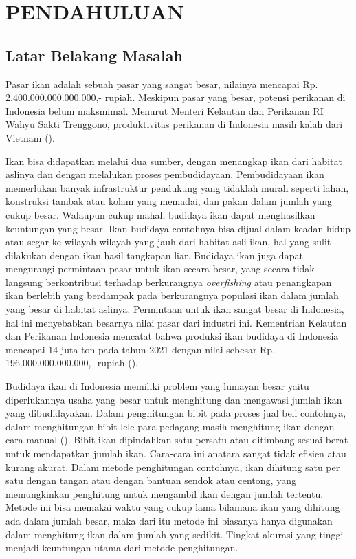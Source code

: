 
\chapter{PENDAHULUAN}

\section{Latar Belakang Masalah}

Pasar ikan adalah sebuah pasar yang sangat besar, nilainya mencapai 
Rp. 2.400.000.000.000.000,- rupiah. Meskipun pasar yang besar, potensi 
perikanan di Indonesia belum maksmimal. 
Menurut Menteri Kelautan dan Perikanan RI Wahyu Sakti Trenggono, produktivitas 
perikanan di Indonesia masih kalah dari Vietnam (\cite{harianjogja}). 

Ikan bisa didapatkan melalui dua sumber, dengan menangkap ikan dari habitat 
aslinya dan dengan melalukan proses pembudidayaan. Pembudidayaan ikan 
memerlukan banyak infrastruktur pendukung yang tidaklah murah seperti 
lahan, konstruksi tambak atau kolam yang memadai, dan pakan dalam jumlah 
yang cukup besar. Walaupun cukup mahal, budidaya ikan dapat 
menghasilkan keuntungan yang besar.  Ikan budidaya contohnya bisa dijual 
dalam keadan hidup atau segar ke wilayah-wilayah yang jauh dari habitat asli ikan, 
hal yang sulit dilakukan dengan ikan hasil tangkapan liar. Budidaya ikan 
juga dapat mengurangi permintaan pasar untuk ikan secara besar, yang secara tidak 
langsung berkontribusi terhadap berkurangnya \textit{overfishing} atau penangkapan 
ikan berlebih yang berdampak pada berkurangnya populasi ikan dalam jumlah 
yang besar di habitat aslinya. Permintaan untuk ikan sangat besar di 
Indonesia, hal ini menyebabkan besarnya nilai pasar dari industri ini. 
Kementrian Kelautan dan Perikanan Indonesia mencatat bahwa 
produksi ikan budidaya di Indonesia mencapai 14 juta ton pada tahun 
2021 dengan nilai sebesar Rp. 196.000.000.000.000,- rupiah (\cite{KKP}).

Budidaya ikan di Indonesia memiliki problem yang lumayan besar yaitu 
diperlukannya usaha yang besar untuk menghitung dan mengawasi jumlah ikan 
yang dibudidayakan. Dalam penghitungan bibit pada proses jual beli contohnya, 
dalam menghitungan bibit lele para pedagang masih menghitung ikan dengan 
cara manual (\cite{alamri}). Bibit ikan dipindahkan satu persatu atau 
ditimbang sesuai berat untuk mendapatkan jumlah ikan. Cara-cara ini anatara sangat tidak 
efisien atau kurang akurat. Dalam metode penghitungan contohnya, ikan 
dihitung satu per satu dengan tangan atau dengan bantuan sendok atau centong, 
yang memungkinkan penghitung untuk mengambil ikan dengan jumlah tertentu. 
Metode ini bisa memakai waktu yang cukup lama bilamana ikan yang dihitung 
ada dalam jumlah besar, maka dari itu metode ini biasanya hanya digunakan 
dalam menghitung ikan dalam jumlah yang sedikit. Tingkat akurasi yang 
tinggi menjadi keuntungan utama dari metode penghitungan.


